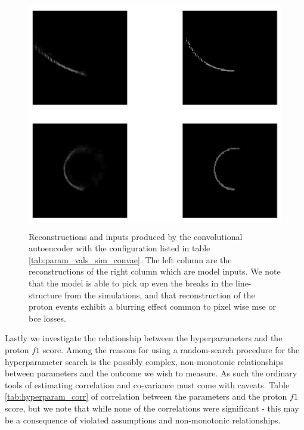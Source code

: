 \begin{figure}
\includegraphics[width=\textwidth, height=4in]{plots/convae_reconstruction.png}
\caption[CONV-AE reconstructions of simulated AT-TPC events]{Reconstructions and inputs produced by the convolutional autoencoder with the configuration listed in table \ref{tab:param_vals_sim_convae}. The left column are the reconstructions of the right column which are model inputs. We note that the model is able to pick up even the breaks in the line-structure from the simulations, and that reconstruction of the proton events exhibit a blurring effect common to pixel wise mse or bce losses.}\label{fig:sim_convae_reconstruction}
\end{figure}

Lastly we investigate the relationship between the hyperparameters and the proton $f1$ score. Among the reasons for using a random-search procedure for the hyperparameter search is the possibly complex, non-monotonic relationships between parameters and the outcome we wish to measure. As such the ordinary tools of estimating correlation and co-variance must come with caveats. Table \ref{tab:hyperparam_corr} of correlation between the parameters and the proton $f1$ score, but we note that while none of the correlations were significant - this may be a consequence of violated assumptions and non-monotonic relationships.

